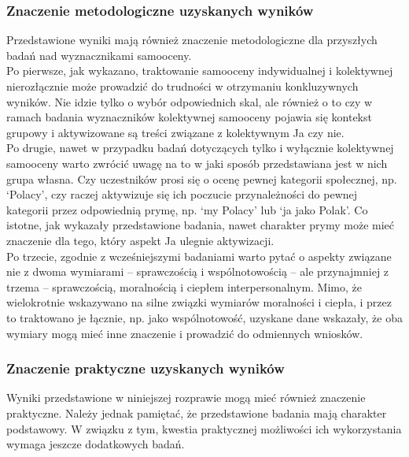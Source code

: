 \documentclass[man]{apa6}
\begin{document}
\subsubsection{Znaczenie metodologiczne uzyskanych wyników}

Przedstawione wyniki mają również znaczenie metodologiczne dla przyszłych badań nad wyznacznikami samooceny.\\

Po pierwsze, jak wykazano, traktowanie samooceny indywidualnej i kolektywnej nierozłącznie może prowadzić do trudności w otrzymaniu konkluzywnych wyników. Nie idzie tylko o wybór odpowiednich skal, ale również o to czy w ramach badania wyznaczników kolektywnej samooceny pojawia się kontekst grupowy i aktywizowane są treści związane z kolektywnym Ja czy nie. \\

Po drugie, nawet w przypadku badań dotyczących tylko i wyłącznie kolektywnej samooceny warto zwrócić uwagę na to w jaki sposób przedstawiana jest w nich grupa własna. Czy uczestników prosi się o ocenę pewnej kategorii społecznej, np. `Polacy', czy raczej aktywizuje się ich poczucie przynależności do pewnej kategorii przez odpowiednią prymę, np. `my Polacy' lub `ja jako Polak'. Co istotne, jak wykazały przedstawione badania, nawet charakter prymy może mieć znaczenie dla tego, który aspekt Ja ulegnie aktywizacji. \\

Po trzecie, zgodnie z wcześniejszymi badaniami \parencite[np.,][]{leach2007group} warto pytać o aspekty związane nie z dwoma wymiarami -- sprawczością i wspólnotowością -- ale przynajmniej z trzema -- sprawczością, moralnością i ciepłem interpersonalnym. Mimo, że wielokrotnie wskazywano na silne związki wymiarów moralności i ciepła, i przez to traktowano je łącznie, np. jako wspólnotowość, uzyskane dane wskazały, że oba wymiary mogą mieć inne znaczenie i prowadzić do odmiennych wniosków.

\subsubsection{Znaczenie praktyczne uzyskanych wyników}

Wyniki przedstawione w niniejszej rozprawie mogą mieć również znaczenie praktyczne. Należy jednak pamiętać, że przedstawione badania mają charakter podstawowy. W związku z tym, kwestia praktycznej możliwości ich wykorzystania wymaga jeszcze dodatkowych badań.\\
\end{document}
